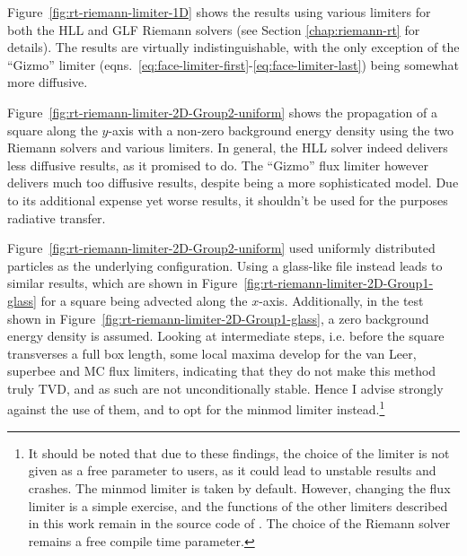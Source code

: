 Figure~\ref{fig:rt-riemann-limiter-1D} shows the results using various limiters for both the HLL and GLF Riemann solvers (see Section \ref{chap:riemann-rt} for details). The results are virtually
indistinguishable, with the only exception of the ``Gizmo'' limiter
(eqns.~\ref{eq:face-limiter-first}-\ref{eq:face-limiter-last}) being somewhat more diffusive.

Figure~\ref{fig:rt-riemann-limiter-2D-Group2-uniform} shows the propagation of a square along the
$y$-axis with a non-zero background energy density using the two Riemann solvers and various
limiters. In general, the HLL solver indeed delivers less diffusive results, as it promised to do.
The ``Gizmo'' flux limiter however delivers much too diffusive results, despite being a more
sophisticated model. Due to its additional expense yet worse results, it shouldn't be used for the
purposes radiative transfer.


Figure~\ref{fig:rt-riemann-limiter-2D-Group2-uniform} used uniformly distributed particles as the
underlying configuration. Using a glass-like file instead leads to similar results, which are shown
in Figure~\ref{fig:rt-riemann-limiter-2D-Group1-glass} for a square being advected along the
$x$-axis. Additionally, in the test shown in Figure~\ref{fig:rt-riemann-limiter-2D-Group1-glass}, a
zero background energy density is assumed. Looking at intermediate steps, i.e. before the square
transverses a full box length, some local maxima develop for the van Leer, superbee and MC flux
limiters, indicating that they do not make this method truly TVD, and as such are not
unconditionally stable. Hence I advise strongly against the use of them, and to opt for the minmod
limiter instead.\footnote{
It should be noted that due to these findings, the choice of the limiter is not given as a free
parameter to users, as it could lead to unstable results and crashes. The minmod limiter is taken
by default. However, changing the flux limiter is a simple exercise, and the functions of the other
limiters described in this work remain in the source code of \GEARRT. The choice of the Riemann
solver remains a free compile time parameter.
}


